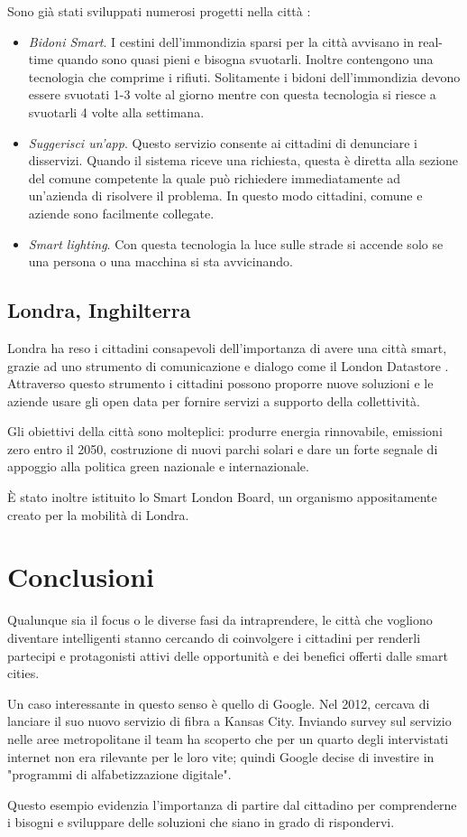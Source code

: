 Sono già stati sviluppati numerosi progetti nella città \cite{StockholmProjects}:
\begin{itemize}
    \item \emph{Bidoni Smart}. I cestini dell'immondizia sparsi per la città avvisano in real-time quando sono quasi pieni e bisogna svuotarli. Inoltre contengono una tecnologia che comprime i rifiuti. Solitamente i bidoni dell'immondizia devono essere svuotati 1-3 volte al giorno mentre con questa tecnologia si riesce a svuotarli 4 volte alla settimana.
    \item \emph{Suggerisci un'app}. Questo servizio consente ai cittadini di denunciare i disservizi. Quando il sistema riceve una richiesta, questa è diretta alla sezione del comune competente la quale può richiedere immediatamente ad un'azienda di risolvere il problema. In questo modo cittadini, comune e aziende sono facilmente collegate.
    \item \emph{Smart lighting}. Con questa tecnologia la luce sulle strade si accende solo se una persona o una macchina si sta avvicinando.
\end{itemize}
\subsection{Londra, Inghilterra}
Londra ha reso i cittadini consapevoli dell'importanza di avere una città smart, grazie ad uno strumento di comunicazione e dialogo come il London Datastore \cite{evolvere}.
Attraverso questo strumento i cittadini possono proporre nuove soluzioni e le aziende usare gli open data per fornire servizi a supporto della collettività. 

Gli obiettivi della città sono molteplici: produrre energia rinnovabile, emissioni zero entro il 2050, costruzione di nuovi parchi solari e dare un forte segnale di appoggio alla politica green nazionale e internazionale.

È stato inoltre istituito lo Smart London Board, un organismo appositamente creato per la mobilità di Londra.


\section{Conclusioni}
Qualunque sia il focus o le diverse fasi da intraprendere, le città che vogliono diventare intelligenti stanno cercando di coinvolgere i cittadini per renderli partecipi e protagonisti attivi delle opportunità e dei benefici offerti dalle smart cities.

Un caso interessante in questo senso è quello di Google. Nel 2012, cercava di lanciare il suo nuovo servizio di fibra a Kansas City. Inviando survey sul servizio nelle aree metropolitane il team ha scoperto che per un quarto degli intervistati internet non era rilevante per le loro vite; quindi Google decise di investire in "programmi di alfabetizzazione digitale"\cite{theEconomicAndSocialValue}. 

Questo esempio evidenzia l'importanza di partire dal cittadino per comprenderne i bisogni e sviluppare delle soluzioni che siano in grado di rispondervi.